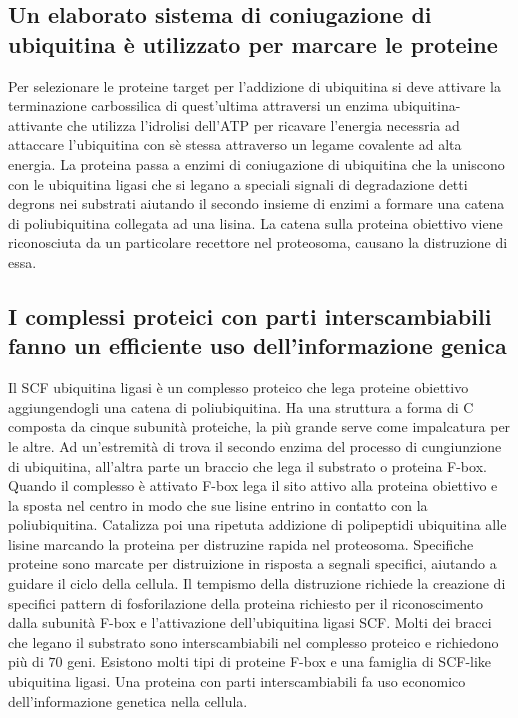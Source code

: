 \subsection{Un elaborato sistema di coniugazione di ubiquitina \`e utilizzato per marcare le proteine}
Per selezionare le proteine target per l'addizione di ubiquitina si deve attivare la terminazione carbossilica di quest'ultima attraversi un enzima ubiquitina-attivante che utilizza 
l'idrolisi dell'ATP per ricavare l'energia necessria ad attaccare l'ubiquitina con s\`e stessa attraverso un legame covalente ad alta energia. La proteina passa a enzimi di coniugazione
di ubiquitina che la uniscono con le ubiquitina ligasi che si legano a speciali signali di degradazione detti degrons nei substrati aiutando il secondo insieme di enzimi a formare una
catena di poliubiquitina collegata ad una lisina. La catena sulla proteina obiettivo viene riconosciuta da un particolare recettore nel proteosoma, causano la distruzione di essa. 
\subsection{I complessi proteici con parti interscambiabili fanno un efficiente uso dell'informazione genica}
Il SCF ubiquitina ligasi \`e un complesso proteico che lega proteine obiettivo aggiungendogli una catena di poliubiquitina. Ha una struttura a forma di C composta da cinque subunit\`a
proteiche, la pi\`u grande serve come impalcatura per le altre. Ad un'estremit\`a di trova il secondo enzima del processo di cungiunzione di ubiquitina, all'altra parte un braccio
che lega il substrato o proteina F-box. Quando il complesso \`e attivato F-box lega il sito attivo alla proteina obiettivo e la sposta nel centro in modo che sue lisine entrino in 
contatto con la poliubiquitina. Catalizza poi una ripetuta addizione di polipeptidi ubiquitina alle lisine marcando la proteina per distruzine rapida nel proteosoma.
Specifiche proteine sono marcate per distruizione in risposta a segnali specifici, aiutando a guidare il ciclo della cellula. Il tempismo della distruzione richiede la creazione di 
specifici pattern di fosforilazione della proteina richiesto per il riconoscimento dalla subunit\`a F-box e l'attivazione dell'ubiquitina ligasi SCF. Molti dei bracci che legano il 
substrato sono interscambiabili nel complesso proteico e richiedono pi\`u di $70$ geni. Esistono molti tipi di proteine F-box e una famiglia di SCF-like ubiquitina ligasi. Una proteina
con parti interscambiabili fa uso economico dell'informazione genetica nella cellula.
